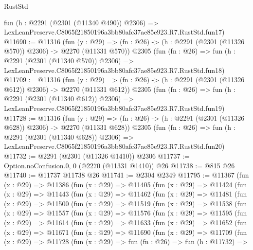 \begin{lexlean}{RustStd}
\begin{coremodule}
    fun (h : @2291 (@2301 (@11340 @490)) @2306) =>
    LexLeanPreserve.C8065f21850196a3bb80afc37ae85e923.R7.RustStd.fun17)
@11690 := @11316
    (fun (y : @29) => (fn : @26) -> (h : @2291 (@2301 (@11326 @570)) @2306) -> @2270 (@11331 @570))
    @2305
    (fun (fn : @26) =>
    fun (h : @2291 (@2301 (@11340 @570)) @2306) =>
    LexLeanPreserve.C8065f21850196a3bb80afc37ae85e923.R7.RustStd.fun18)
@11709 := @11316
    (fun (y : @29) => (fn : @26) -> (h : @2291 (@2301 (@11326 @612)) @2306) -> @2270 (@11331 @612))
    @2305
    (fun (fn : @26) =>
    fun (h : @2291 (@2301 (@11340 @612)) @2306) =>
    LexLeanPreserve.C8065f21850196a3bb80afc37ae85e923.R7.RustStd.fun19)
@11728 := @11316
    (fun (y : @29) => (fn : @26) -> (h : @2291 (@2301 (@11326 @628)) @2306) -> @2270 (@11331 @628))
    @2305
    (fun (fn : @26) =>
    fun (h : @2291 (@2301 (@11340 @628)) @2306) =>
    LexLeanPreserve.C8065f21850196a3bb80afc37ae85e923.R7.RustStd.fun20)
@11732 := @2291 (@2301 (@11326 @1410)) @2306
@11737 := Option.noConfusion.{0, 0} (@2270 (@11331 @1410)) @26
@11738 := @815 @26
@11740 := @11737 @11738 @26
@11741 := @2304 @2349
@11795 := @11367
    (fun (x : @29) =>
    @11386
      (fun (x : @29) =>
      @11405
        (fun (x : @29) =>
        @11424
          (fun (x : @29) =>
          @11443
            (fun (x : @29) =>
            @11462
              (fun (x : @29) =>
              @11481
                (fun (x : @29) =>
                @11500
                  (fun (x : @29) =>
                  @11519
                    (fun (x : @29) =>
                    @11538
                      (fun (x : @29) =>
                      @11557
                        (fun (x : @29) =>
                        @11576
                          (fun (x : @29) =>
                          @11595
                            (fun (x : @29) =>
                            @11614
                              (fun (x : @29) =>
                              @11633
                                (fun (x : @29) =>
                                @11652
                                  (fun (x : @29) =>
                                  @11671
                                    (fun (x : @29) =>
                                    @11690
                                      (fun (x : @29) =>
                                      @11709
                                        (fun (x : @29) =>
                                        @11728
                                          (fun (x : @29) =>
                                          fun (fn : @26) =>
                                          fun (h : @11732) =>

\end{coremodule}
\end{lexlean}
